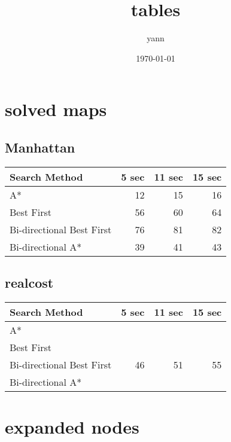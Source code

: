 \documentclass[11pt]{article}
\title{tables}
\author{yann}
\date{\today}
\begin{document}
\maketitle

\setcounter{tocdepth}{3}
\tableofcontents
\vspace*{1cm}
\section{solved maps}
\label{sec-1}
\subsection{Manhattan}
\label{sec-1-1}



\begin{center}
\begin{tabular}{lrrr}
 Search Method              &  5 sec  &  11 sec  &  15 sec  \\
\hline
 A*                         &     12  &      15  &      16  \\
 Best First                 &     56  &      60  &      64  \\
 Bi-directional Best First  &     76  &      81  &      82  \\
 Bi-directional A*          &     39  &      41  &      43  \\
\end{tabular}
\end{center}
\subsection{realcost}
\label{sec-1-2}



\begin{center}
\begin{tabular}{lrrr}
 Search Method              &  5 sec  &  11 sec  &  15 sec  \\
\hline
 A*                         &         &          &          \\
 Best First                 &         &          &          \\
 Bi-directional Best First  &     46  &      51  &      55  \\
 Bi-directional A*          &         &          &          \\
\end{tabular}
\end{center}
\section{expanded nodes}
\label{sec-2}
\end{document}
